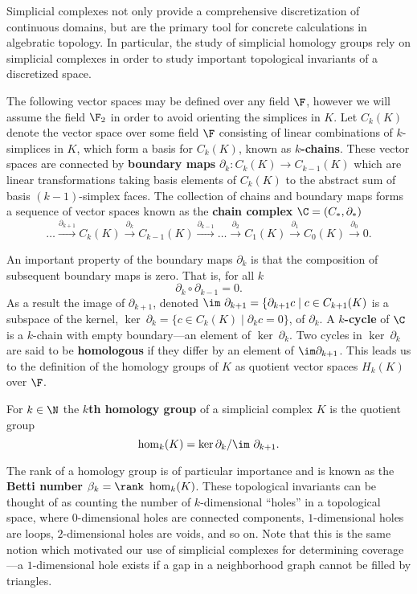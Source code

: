 
Simplicial complexes not only provide a comprehensive discretization of continuous domains, but are the primary tool for concrete calculations in algebratic topology.
In particular, the study of simplicial homology groups rely on simplicial complexes in order to study important topological invariants of a discretized space.

The following vector spaces may be defined over any field $\F$, however we will assume the field $\F_2$ in order to avoid orienting the simplices in $K$.
Let $C_k(K)$ denote the vector space over some field $\F$ consisting of linear combinations of $k$-simplices in $K$, which form a basis for $C_k(K)$, known as \textbf{$k$-chains}.
These vector spaces are connected by \textbf{boundary maps} $\partial_k:C_k(K)\to C_{k-1}(K)$ which are linear transformations taking basis elements of $C_k(K)$ to the abstract sum of basis $(k-1)$-simplex faces.
The collection of chains and boundary maps forms a sequence of vector spaces known as the \textbf{chain complex} $\C = (C_*,\partial_*)$
\[
    \ldots\xrightarrow{\partial_{k+1}}
    C_k(K)\xrightarrow{\partial_{k}}
    C_{k-1}(K)\xrightarrow{\partial_{k-1}}
    \ldots\xrightarrow{\partial_2}
    C_1(K)\xrightarrow{\partial_{1}}
    C_0(K)\xrightarrow{\partial_0} 0.
\]

An important property of the boundary maps $\partial_k$ is that the composition of subsequent boundary maps is zero.
That is, for all $k$
\[
  \partial_k\circ\partial_{k-1} = 0.
\]
As a result the image of $\partial_{k+1}$, denoted $\im~\partial_{k+1} = \{\partial_{k+1}c\mid c\in C_{k+1}(K)$ is a subspace of the kernel, $\ker~\partial_k = \{c\in C_k(K)\mid \partial_k c = 0\}$, of $\partial_k$.
A \textbf{$k$-cycle} of $\C$ is a $k$-chain with empty boundary---an element of $\ker~\partial_k$.
Two cycles in $\ker~\partial_k$ are said to be \textbf{homologous} if they differ by an element of $\im\partial_{k+1}$.
This leads us to the definition of the homology groups of $K$ as quotient vector spaces $H_k(K)$ over $\F$.

\begin{definition}
    For $k\in\N$ the \textbf{$k$th homology group} of a simplicial complex $K$ is the quotient group
    \[ \hom_k(K) = \ker\partial_k/\im~\partial_{k+1}. \]
\end{definition}

The rank of a homology group is of particular importance and is known as the \textbf{Betti number} $\beta_k = \rank~ \hom_k(K)$.
These topological invariants can be thought of as counting the number of $k$-dimensional ``holes'' in a topological space, where $0$-dimensional holes are connected components, $1$-dimensional holes are loops, $2$-dimensional holes are voids, and so on.
Note that this is the same notion which motivated our use of simplicial complexes for determining coverage---a $1$-dimensional hole exists if a gap in a neighborhood graph cannot be filled by triangles.

